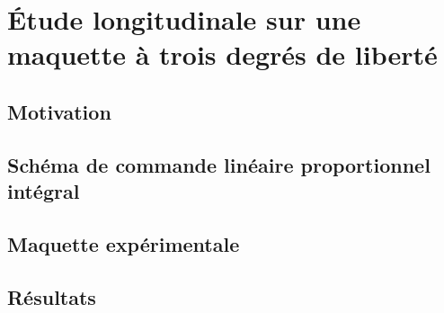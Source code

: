 \chapter{Étude longitudinale sur une maquette à trois degrés de liberté}
\minitoc

\section{Motivation}

\section{Schéma de commande linéaire proportionnel intégral}

\section{Maquette expérimentale}

\section{Résultats}






